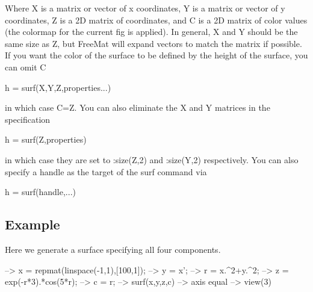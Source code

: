 Where {\ttfamily X} is a matrix or vector of {\ttfamily x} coordinates, {\ttfamily Y} is a matrix or vector of {\ttfamily y} coordinates, {\ttfamily Z} is a 2\-D matrix of coordinates, and {\ttfamily C} is a 2\-D matrix of color values (the colormap for the current fig is applied). In general, {\ttfamily X} and {\ttfamily Y} should be the same size as {\ttfamily Z}, but Free\-Mat will expand vectors to match the matrix if possible. If you want the color of the surface to be defined by the height of the surface, you can omit {\ttfamily C} \begin{DoxyVerb}  h = surf(X,Y,Z,properties...)
\end{DoxyVerb}
 in which case {\ttfamily C=Z}. You can also eliminate the {\ttfamily X} and {\ttfamily Y} matrices in the specification \begin{DoxyVerb}  h = surf(Z,properties)
\end{DoxyVerb}
 in which case they are set to {\-:size(\-Z,2)} and {\-:size(\-Y,2)} respectively. You can also specify a handle as the target of the {\ttfamily surf} command via \begin{DoxyVerb}  h = surf(handle,...)
\end{DoxyVerb}
 \hypertarget{variables_struct_Example}{}\subsection{Example}\label{variables_struct_Example}
Here we generate a surface specifying all four components.


\begin{DoxyVerbInclude}
--> x = repmat(linspace(-1,1),[100,1]);
--> y = x';
--> r = x.^2+y.^2;
--> z = exp(-r*3).*cos(5*r);
--> c = r;
--> surf(x,y,z,c)
--> axis equal
--> view(3)
\end{DoxyVerbInclude}



